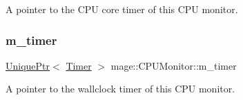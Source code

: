 A pointer to the C\+PU core timer of this C\+PU monitor. \hypertarget{classmage_1_1_c_p_u_monitor_a5d24b6b9d684a6d0c34175052a8ac850}{}\label{classmage_1_1_c_p_u_monitor_a5d24b6b9d684a6d0c34175052a8ac850} 
\subsubsection{\texorpdfstring{m\+\_\+timer}{m\_timer}}
{\footnotesize\ttfamily \hyperlink{namespacemage_a3316d7143a973e37adf1110f2e80ca31}{Unique\+Ptr}$<$ \hyperlink{classmage_1_1_timer}{Timer} $>$ mage\+::\+C\+P\+U\+Monitor\+::m\+\_\+timer\hspace{0.3cm}{\ttfamily [private]}}

A pointer to the wallclock timer of this C\+PU monitor. 